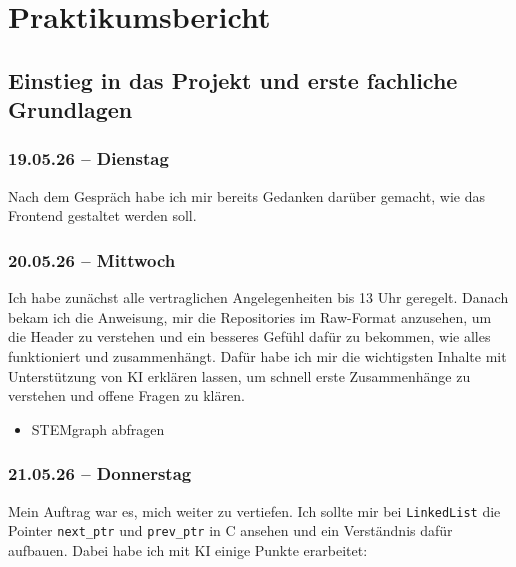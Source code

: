 \section{Praktikumsbericht}

\subsection{Einstieg in das Projekt und erste fachliche Grundlagen}
\subsubsection{19.05.26 -- Dienstag}

Nach dem Gespräch habe ich mir bereits Gedanken darüber gemacht, wie das Frontend gestaltet werden soll.

\subsubsection{20.05.26 -- Mittwoch}

Ich habe zunächst alle vertraglichen Angelegenheiten bis 13 Uhr geregelt. Danach bekam ich die Anweisung, mir die Repositories im Raw-Format anzusehen, um die Header zu verstehen und ein besseres Gefühl dafür zu bekommen, wie alles funktioniert und zusammenhängt.
Dafür habe ich mir die wichtigsten Inhalte mit Unterstützung von KI erklären lassen, um schnell erste Zusammenhänge zu verstehen und offene Fragen zu klären.

\begin{itemize}
    \item STEMgraph abfragen
\end{itemize}

\subsubsection{21.05.26 -- Donnerstag}

Mein Auftrag war es, mich weiter zu vertiefen. Ich sollte mir bei \texttt{LinkedList} die Pointer \texttt{next\_ptr} und \texttt{prev\_ptr} in C ansehen und ein Verständnis dafür aufbauen. Dabei habe ich mit KI einige Punkte erarbeitet:

